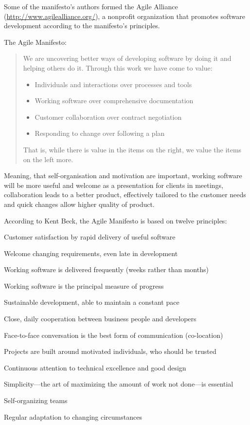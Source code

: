Some of the manifesto's authors formed the Agile Alliance (\url{http://www.agilealliance.org/}), a nonprofit organization that promotes software development according to the manifesto's principles.

The Agile Manifesto:
\begin{quotation}
\begin{small}

We are uncovering better ways of developing software by doing it and helping others do it. Through this work we have come to value:

\begin{itemize}
\item Individuals and interactions over processes and tools
\item Working software over comprehensive documentation
\item Customer collaboration over contract negotiation
\item Responding to change over following a plan
\end{itemize}

That is, while there is value in the items on the right, we value the items on the left more.
\end{small}
\end{quotation}


Meaning, that self-organisation and motivation are important, working software will be more useful and welcome as a presentation for clients in meetings, collaboration leads to a better product, effectively tailored to the customer needs and quick changes allow higher quality of product.


According to Kent Beck,\cite{beck} the Agile Manifesto is based on twelve principles:
\begin{compactenum}
\item Customer satisfaction by rapid delivery of useful software
\item Welcome changing requirements, even late in development
\item Working software is delivered frequently (weeks rather than months)
\item Working software is the principal measure of progress
\item Sustainable development, able to maintain a constant pace
\item Close, daily cooperation between business people and developers
\item Face-to-face conversation is the best form of communication (co-location)
\item Projects are built around motivated individuals, who should be trusted
\item Continuous attention to technical excellence and good design
\item Simplicity—the art of maximizing the amount of work not done—is essential
\item Self-organizing teams
\item Regular adaptation to changing circumstances
\end{compactenum}

